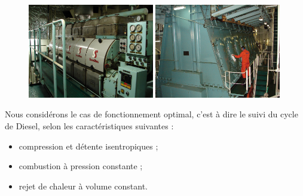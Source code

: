 	\begin{figure}
		\begin{center}
			\includegraphics[width=0.49\textwidth]{images/photo_diesel_generateur.jpg}
			\includegraphics[width=0.49\textwidth]{images/photo_diesel_propulsion.jpg}
		\end{center}
		\label{fig_photos_moteur_diesel}
	\end{figure}

	Nous considérons le cas de fonctionnement optimal, c’est à dire le suivi du cycle de Diesel, selon les caractéristiques suivantes :
	\begin{itemize}
		\item compression et détente isentropiques ;
		\item combustion à pression constante ;
		\item rejet de chaleur à volume constant.
	\end{itemize}
	
